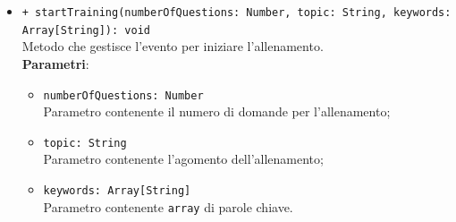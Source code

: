 \begin{itemize}
\begin{itemize}
			\item \texttt{+ startTraining(numberOfQuestions: Number, topic: String, keywords: Array[String]): void} \\
			Metodo che gestisce l'evento per iniziare l'allenamento. \\
			\textbf{Parametri}:
			\begin{itemize}
				\item \texttt{numberOfQuestions: Number} \\
				Parametro contenente il numero di domande per l'allenamento;
				\item \texttt{topic: String} \\
				Parametro contenente l'agomento dell'allenamento;
				\item \texttt{keywords: Array[String]} \\
				Parametro contenente \texttt{array} di parole chiave.
			\end{itemize}
		\end{itemize}
	\end{itemize}
	
	
